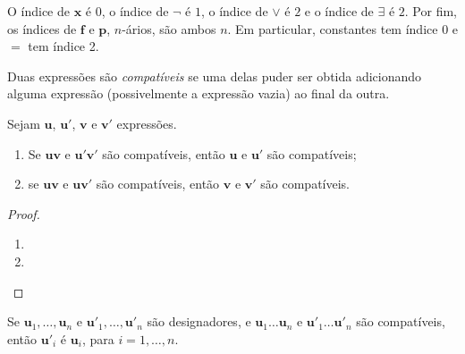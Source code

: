 \begin{remark}
    O índice de $\mathbf{x}$ é $0$, o índice de $\neg$ é $1$, o índice de $\lor$ é $2$ e o índice de $\exists$ é $2$. Por fim, os índices de $\mathbf{f}$ e $\mathbf{p}$, $n$-ários, são ambos $n$. Em particular, constantes tem índice $0$ e $=$ tem índice 2.
\end{remark}

\begin{definition}
    Duas expressões são \emph{compatíveis} se uma delas puder ser obtida adicionando alguma expressão (possivelmente a expressão vazia) ao final da outra.
\end{definition}

\begin{proposition}
    Sejam $\mathbf{u}$, $\mathbf{u}'$, $\mathbf{v}$ e $\mathbf{v}'$ expressões.
        \begin{enumerate}[leftmargin=*, align=left, label=\textbf{(\alph*)}]
            \item Se \( \mathbf{u} \mathbf{v} \) e \( \mathbf{u}'\mathbf{v}' \) são compatíveis, então \( \mathbf{u} \) e \( \mathbf{u}' \) são compatíveis; 
            \item se \( \mathbf{u} \mathbf{v} \) e \( \mathbf{u} \mathbf{v}' \) são compatíveis, então \( \mathbf{v} \) e \( \mathbf{v}' \) são compatíveis.
        \end{enumerate}
\end{proposition}

\begin{proof}
    \leavevmode
        \begin{enumerate}[leftmargin=*, align=left, label=\textbf{(\alph*)}]
            \item \blackproof
            \item \blackproof
        \end{enumerate}
\end{proof}

\begin{lemma}
    Se $\mathbf{u}_1, \ldots, \mathbf{u}_n$ e $\mathbf{u}'_1, \ldots, \mathbf{u}'_n$ são designadores, e $\mathbf{u}_1 \ldots \mathbf{u}_n$ e $\mathbf{u}'_1 \ldots \mathbf{u}'_n$ são compatíveis, então $\mathbf{u}'_i$ é $\mathbf{u}_i$, para $i = 1, \ldots, n$.
\end{lemma}

